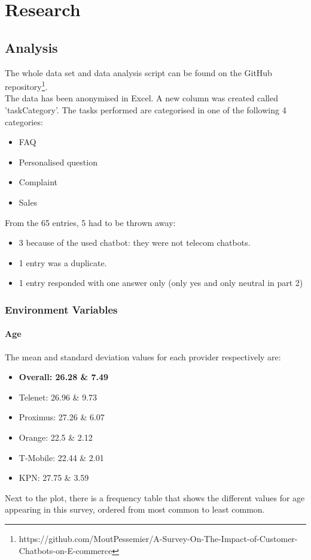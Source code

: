 \mainmatter
\pagestyle{headings}
\chapter{Research}
\label{ch:research}

\section{Analysis}
The whole data set and data analysis script can be found on the GitHub repository\footnote{https://github.com/MoutPessemier/A-Survey-On-The-Impact-of-Customer-Chatbots-on-E-commerce}.\\
\break
The data has been anonymised in Excel. A new column was created called 'taskCategory'. The tasks performed are categorised in one of the following 4 categories:
\begin{itemize}
	\setlength\itemsep{-0.1em}
	\item FAQ
	\item Personalised question
	\item Complaint
	\item Sales
\end{itemize}
From the 65 entries, 5 had to be thrown away:
\begin{itemize}
	\setlength\itemsep{-0.1em}
	\item 3 because of the used chatbot: they were not telecom chatbots.
	\item 1 entry was a duplicate.
	\item 1 entry responded with one answer only (only yes and only neutral in part 2)
\end{itemize}

\subsection{Environment Variables}
\subsubsection{Age}
The mean and standard deviation values for each provider respectively are:
\begin{itemize}
	\setlength\itemsep{-0.1em}
	\item \textbf{Overall: 26.28 \& 7.49}
	\item Telenet: 26.96 \& 9.73
	\item Proximus: 27.26 \& 6.07
	\item Orange: 22.5 \& 2.12
	\item T-Mobile: 22.44 \& 2.01
	\item KPN: 27.75 \& 3.59
\end{itemize}
Next to the plot, there is a frequency table that shows the different values for age appearing in this survey, ordered from most common to least common.

